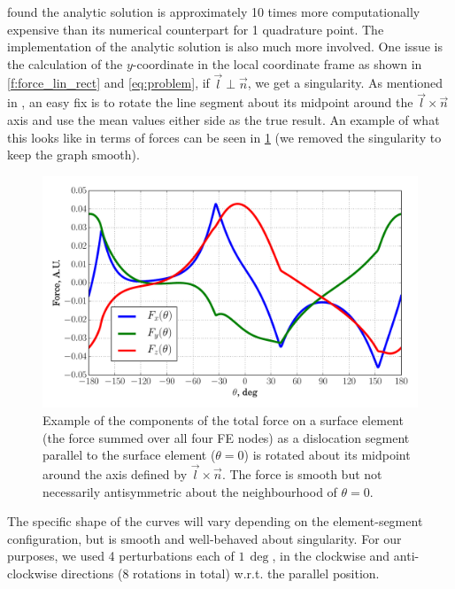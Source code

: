 \documentclass[11pt]{iopart}
\begin{document}
\citet{Queyreau} found the analytic solution is approximately 10 times more computationally expensive than its numerical counterpart for 1 quadrature point. The implementation of the analytic solution is also much more involved. One issue is the calculation of the $y$-coordinate in the local coordinate frame as shown in \cref{f:force_lin_rect} and \cref{eq:problem}, if $\vec{l} \perp \vec{n}$, we get a singularity. As mentioned in \cite{Queyreau}, an easy fix is to rotate the line segment about its midpoint around the $\vec{l} \times \vec{n}$ axis and use the mean values either side as the true result. An example of what this looks like in terms of forces can be seen in \cref{f:rotate} (we removed the singularity to keep the graph smooth).
\begin{figure}[htb]
    \centering
    \includegraphics[width=0.8\linewidth]{ftot_rotation_lin_rect.pdf}
    \caption{Example of the components of the total force on a surface element (the force summed over all four FE nodes) as a dislocation segment parallel to the surface element ($\theta = 0$) is rotated about its midpoint around the axis defined by $\vec{l}\times\vec{n}$. The force is smooth but not necessarily antisymmetric about the neighbourhood of $\theta=0$.}
    \label{f:rotate}
\end{figure}
The specific shape of the curves will vary depending on the element-segment configuration, but is smooth and well-behaved about singularity. For our purposes, we used 4 perturbations each of $1\,\deg$, in the clockwise and anti-clockwise directions (8 rotations in total) w.r.t. the parallel position.
\end{document}
